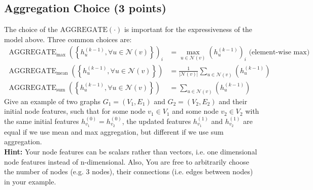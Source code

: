 \documentclass{article}
\numberwithin{figure}{section}
\begin{document}
	
	\subsection{Aggregation Choice (3 points)} 
	The choice of the $\operatorname{AGGREGATE(\cdot)}$ is important for the expressiveness of the model above. Three common choices are: $$
	\begin{aligned}
		\operatorname{AGGREGATE}_{\max }\left(\left\{h_u^{(k-1)}, \forall u \in \mathcal{N}(v)\right\}\right)_i & =\max _{u \in \mathcal{N}(v)}\left(h_u^{(k-1)}\right)_i \text { (element-wise max)} \\
		\operatorname{AGGREGATE}_{\text {mean}}\left(\left\{h_u^{(k-1)}, \forall u \in \mathcal{N}(v)\right\}\right) & =\frac{1}{|\mathcal{N}(v)|} \sum_{u \in \mathcal{N}(v)}\left(h_u^{(k-1)}\right) \\
		\operatorname{AGGREGATE}_{\text {sum}}\left(\left\{h_u^{(k-1)}, \forall u \in \mathcal{N}(v)\right\}\right) & =\sum_{u \in \mathcal{N}(v)}\left(h_u^{(k-1)}\right)
	\end{aligned}
	$$
	Give an example of two graphs $G_1 = (V_1, E_1)$ and $G_2 = (V_2, E_2)$ and their initial node features, such that for some node $v_1 \in V_1$ and some node $v_2 \in V_2$ with the same initial features $h^{(0)}_{v_1} = h^{(0)}_{v_2}$, the updated features $h^{(1)}_{v_1}$ and $h^{(1)}_{v_2}$ are equal if we use mean and max aggregation, but different if 
	we use sum aggregation.\\
	\textbf{Hint:} Your node features can be scalars rather than vectors, i.e. one dimensional node features instead of n-dimensional. Also, You are free to arbitrarily choose the number of nodes (e.g. 3 nodes), their connections (i.e. edges between
	nodes) in your example.
	
\end{document}
